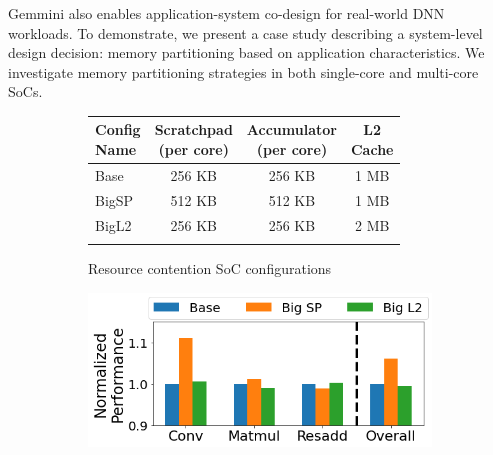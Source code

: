 
Gemmini also enables application-system co-design for real-world DNN workloads. To demonstrate, we present a case study describing a system-level design decision: memory partitioning based on application characteristics. We investigate memory partitioning strategies in both single-core and multi-core SoCs.


\begin{figure}[t]
\centering
\begin{subfigure}[b]{0.325\textwidth}
    \centering
    \scalebox{0.875} {
    \begin{tabular}{ l | c | c | c }
    \hline
    \makecell{Config\\Name} & \makecell{Scratchpad\\(per core)} & \makecell{Accumulator\\(per core)} & \makecell{L2\\Cache} \\  
    \hline
    \hline
    Base & 256 KB & 256 KB & 1 MB   \\
    BigSP & 512 KB & 512 KB & 1 MB  \\
    BigL2 & 256 KB & 256 KB & 2 MB  \\ \hline
    \multicolumn{1}{c}{} & \multicolumn{1}{c}{} & \multicolumn{1}{c}{} & \multicolumn{1}{c}{} \\
    \end{tabular}
    }
    \caption{Resource contention SoC configurations}
    \label{tab:contention-soc-configs}
\end{subfigure}
\hfill
\begin{subfigure}[b]{.325\textwidth}
    \vspace{0pt}
      \centering
      \includegraphics[width=\linewidth]{fig/single-core-contention.png}

\end{subfigure}
\end{figure}
